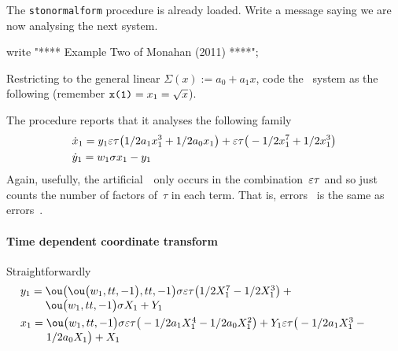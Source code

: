 The \verb|stonormalform| procedure is already loaded.
Write a message saying we are now analysing the next system.
\begin{reduce}
write "**** Example Two of Monahan (2011) ****";
\end{reduce}

Restricting to the general linear $\Sigma(x):=a_0+a_1x$, code the \sde\ system as the following (remember $\verb|x(1)|=x_1=\sqrt x$).

The procedure reports that it analyses the following family 
\begin{align*}&
\dot x_{1}=y_{1} \varepsilon \tau  \big(1/2 a_{1} x_{1}^{3}+1/2 a_{0} x_{1}
\big)+\varepsilon \tau  \big(-1/2 x_{1}^{7}+1/2 x_{1}^{3}\big)
\\&
\dot y_{1}=w_{1} \sigma  x_{1}-y_{1}
\end{align*}
Again, usefully, the artificial~\eps\ only occurs in the combination~\(\varepsilon\tau\) and so just counts the number of factors of~\(\tau\) in each term.  That is, errors~ is the same as errors~.

\paragraph{Time dependent coordinate transform}  Straightforwardly
\begin{align*}&
y_{1}=\ParMath{ \ou\big(\ou\big(w_{1},tt,-1\big),tt,-1\big) \sigma  \eps \tau  
\big(1/2 X_{1}^{7}-1/2 X_{1}^{3}\big)+\ou\big(w_{1},tt,-1\big) \sigma  X
_{1}+Y_{1}
}
\\&
x_{1}=\ParMath{ \ou\big(w_{1},tt,-1\big) \sigma  \eps \tau  \big(-1/2 a_{1} X_{1}
^{4}-1/2 a_{0} X_{1}^{2}\big)+Y_{1} \eps \tau  \big(-1/2 a_{1} X_{1}^{3}
-1/2 a_{0} X_{1}\big)+X_{1}
}
\end{align*}

